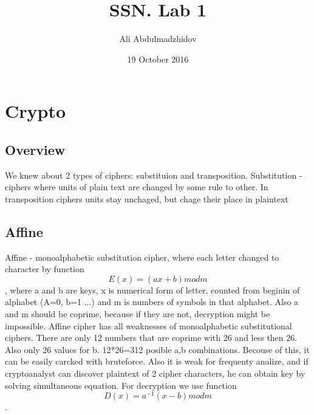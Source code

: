 \documentclass[10pt]{article}
\title{SSN. Lab 1}
\date{19 October 2016}
\author{Ali Abdulmadzhidov}
\begin{document}
\renewcommand*\rmdefault{cmss}
  \maketitle
  \section{Crypto}
  \subsection{Overview}
  We knew about 2 types of ciphers: substituion and transposition. 
  Substitution - ciphers where units of plain text are changed by some rule to other.
  In transposition ciphers units stay unchaged, but chage their place in plaintext
  \subsection{Affine}
  Affine - monoalphabetic substitution cipher, where each letter changed to character by function \begin{equation} E(x) = (ax + b) mod m \end{equation}, where a and b are keys, x is numerical form of letter, counted from beginin of alphabet (A=0, b=1 ...) and m is numbers of symbols in that alphabet. Also a and m should be coprime, because if they are not, decryption might be impossible.
  Affine cipher has all weaknesses of monoalphabetic substitutional ciphers. There are only 12 numbers that are coprime with 26 and less then 26. Also only 26  values for b. 12*26=312 posible a,b combinations. Becouse of this, it can be easily carcked with bruteforce. Also it is weak for frequenty analize, and if cryptoanalyst can discover plaintext of 2 cipher characters, he can obtain key by solving simultaneous equation.
  For decryption we use function \begin{equation} D(x) = a^{-1}(x - b) mod m \end{equation}.
\end{document}
